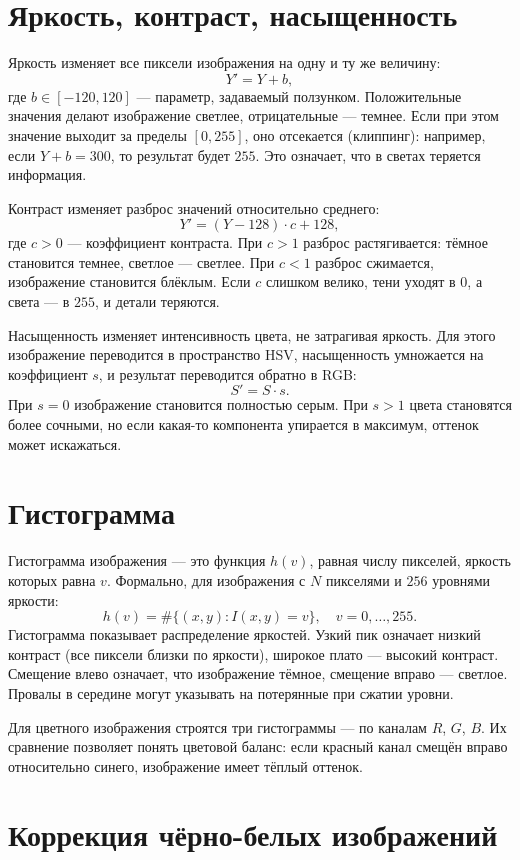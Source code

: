 \documentclass[a4paper,12pt]{article}
\begin{document}
\section{Яркость, контраст, насыщенность}

Яркость изменяет все пиксели изображения на одну и ту же величину:
\[
Y' = Y + b,
\]
где $b \in [-120, 120]$ --- параметр, задаваемый ползунком. Положительные значения делают изображение светлее, отрицательные --- темнее. Если при этом значение выходит за пределы $[0, 255]$, оно отсекается (клиппинг): например, если $Y + b = 300$, то результат будет $255$. Это означает, что в светах теряется информация.

Контраст изменяет разброс значений относительно среднего:
\[
Y' = (Y - 128) \cdot c + 128,
\]
где $c > 0$ --- коэффициент контраста. При $c > 1$ разброс растягивается: тёмное становится темнее, светлое --- светлее. При $c < 1$ разброс сжимается, изображение становится блёклым. Если $c$ слишком велико, тени уходят в $0$, а света --- в $255$, и детали теряются.

Насыщенность изменяет интенсивность цвета, не затрагивая яркость. Для этого изображение переводится в пространство HSV, насыщенность умножается на коэффициент $s$, и результат переводится обратно в RGB:
\[
S' = S \cdot s.
\]
При $s = 0$ изображение становится полностью серым. При $s > 1$ цвета становятся более сочными, но если какая-то компонента упирается в максимум, оттенок может искажаться.

\section{Гистограмма}

Гистограмма изображения --- это функция $h(v)$, равная числу пикселей, яркость которых равна $v$. Формально, для изображения с $N$ пикселями и $256$ уровнями яркости:
\[
h(v) = \#\{ (x, y) : I(x, y) = v \}, \quad v = 0, \ldots, 255.
\]
Гистограмма показывает распределение яркостей. Узкий пик означает низкий контраст (все пиксели близки по яркости), широкое плато --- высокий контраст. Смещение влево означает, что изображение тёмное, смещение вправо --- светлое. Провалы в середине могут указывать на потерянные при сжатии уровни.

Для цветного изображения строятся три гистограммы --- по каналам $R$, $G$, $B$. Их сравнение позволяет понять цветовой баланс: если красный канал смещён вправо относительно синего, изображение имеет тёплый оттенок.

\section{Коррекция чёрно-белых изображений}
\end{document}
